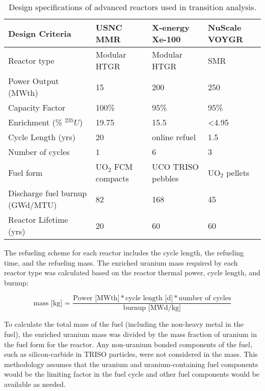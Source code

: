 \begin{table}[ht]
    \centering
    \caption{Design specifications of advanced reactors 
    used in transition analysis.}
    \label{tab:reactor_summary}
    \renewcommand{\arraystretch}{1.5}
    \begin{tabular}{p{3.5cm}p{3cm}p{3cm}p{3cm}}
        \hline
        Design Criteria & \gls{USNC} \gls{MMR} \cite{noauthor_usnc_2021} & 
        X-energy Xe-100 \cite{mulder_overview_2021} & NuScale VOYGR 
        \cite{nuscale_chapter_2020-1,reyes_nuscale_2021,reyes_correction_2022}\\
        \hline
        Reactor type & Modular HTGR & Modular HTGR & SMR\\
        Power Output (MWth) & 15 & 200  & 250 \\
        Capacity Factor & 100\% & 95\% & 95\% \\
        Enrichment (\% $^{235}U$) & 19.75 & 15.5 & <4.95 \\
        Cycle Length (yrs) & 20 & online refuel & 1.5\\
        Number of cycles & 1 & 6 & 3\\
        Fuel form & UO$_2$ \gls{FCM} compacts & UCO \gls{TRISO} pebbles & UO$_2$ pellets\\
        Discharge fuel burnup (GWd/MTU) & 82 & 168  & 45 \\
        Reactor Lifetime (yrs)& 20 & 60 & 60 \\
        \hline
    \end{tabular}
\end{table}

The refueling scheme for each reactor includes the cycle length, the 
refueling time, and the refueling mass. The enriched uranium mass required by 
each reactor type was calculated based on the reactor thermal power, 
cycle length, and burnup:

\begin{equation}
    \text{mass [kg] = }\frac{\text{Power [MWth]}* \text{cycle 
    length [d]} * \text{number of cycles}}{\text{burnup [MWd/kg]}}
    \label{eq:fuel_mass}
\end{equation}

\noindent To calculate the total mass of the fuel (including the non-heavy 
metal in the fuel), the enriched uranium mass was divided by the mass fraction of 
uranium in the fuel form for the reactor. Any non-uranium bonded components 
of the fuel, such as silicon-carbide in \gls{TRISO} particles, were 
not considered in the mass. This methodology assumes that the 
uranium and uranium-containing fuel components would be the limiting 
factor in the fuel cycle and other fuel components would be available as 
needed. 

